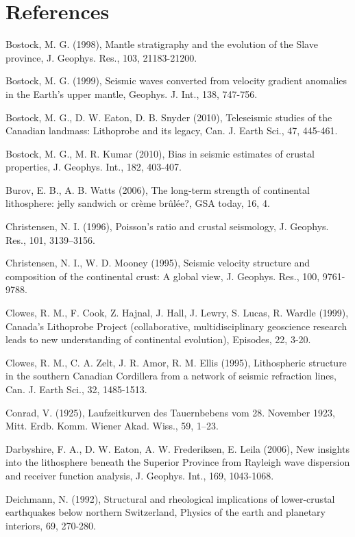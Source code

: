 \documentclass[review]{elsarticle}
\begin{document}


\section{References}

Bostock, M. G. (1998), Mantle stratigraphy and the evolution of the Slave province, J. Geophys. Res., 103, 21183-21200.

Bostock, M. G. (1999), Seismic waves converted from velocity gradient anomalies in the Earth’s upper mantle, Geophys. J. Int., 138, 747-756.

Bostock, M. G., D. W. Eaton, D. B. Snyder (2010), Teleseismic studies of the Canadian landmass: Lithoprobe and its legacy, Can. J. Earth Sci., 47, 445-461.

Bostock, M. G., M. R. Kumar (2010), Bias in seismic estimates of crustal properties, J. Geophys. Int., 182, 403-407.

Burov, E. B., A. B. Watts (2006), The long-term strength of continental lithosphere: jelly sandwich or crème brûlée?, GSA today, 16, 4.

Christensen, N. I. (1996), Poisson's ratio and crustal seismology, J. Geophys. Res., 101, 3139–3156.

Christensen, N. I., W. D. Mooney (1995), Seismic velocity structure and composition of the continental crust: A global view, J. Geophys. Res., 100, 9761-9788.

Clowes, R. M., F. Cook, Z. Hajnal, J. Hall, J. Lewry, S. Lucas, R. Wardle (1999), Canada's Lithoprobe Project (collaborative, multidisciplinary geoscience research leads to new understanding of continental evolution), Episodes, 22, 3-20.

Clowes, R. M., C. A. Zelt, J. R. Amor, R. M. Ellis (1995), Lithospheric structure in the southern Canadian Cordillera from a network of seismic refraction lines, Can. J. Earth Sci., 32, 1485-1513.

Conrad, V. (1925), Laufzeitkurven des Tauernbebens vom 28. November 1923, Mitt. Erdb. Komm. Wiener Akad. Wiss., 59, 1–23.

Darbyshire, F. A., D. W. Eaton, A. W. Frederiksen, E. Leila (2006), New insights into the lithosphere beneath the Superior Province from Rayleigh wave dispersion and receiver function analysis, J. Geophys. Int., 169, 1043-1068.

Deichmann, N. (1992), Structural and rheological implications of lower-crustal earthquakes below northern Switzerland, Physics of the earth and planetary interiors, 69, 270-280.
\end{document}
